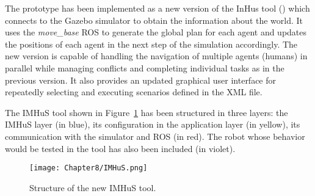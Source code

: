 The prototype has been implemented as a new version of the InHus tool (\cite{favier_SSC}) which connects to the Gazebo simulator to obtain the information about the world. It uses the \emph{move\_base} ROS to generate the global plan for each agent and updates the positions of each agent in the next step of the simulation accordingly. The new version is capable of handling the navigation of multiple agents (humans) in parallel while managing conflicts and completing individual tasks as in the previous version. It also provides an updated graphical user interface for repeatedly selecting and executing scenarios defined in the XML file.

The IMHuS tool shown in Figure~\ref{fig:imhus} has been structured in three layers: the IMHuS layer (in blue), its configuration in the application layer (in yellow), its communication with the simulator and ROS (in red). The robot whose behavior would be tested in the tool has also been included (in violet).

  \begin{figure}[ht]%
     \centering
     \texttt{[image: Chapter8/IMHuS.png]}
     \caption{Structure of the new IMHuS tool.}
     \label{fig:imhus}
 \end{figure}

